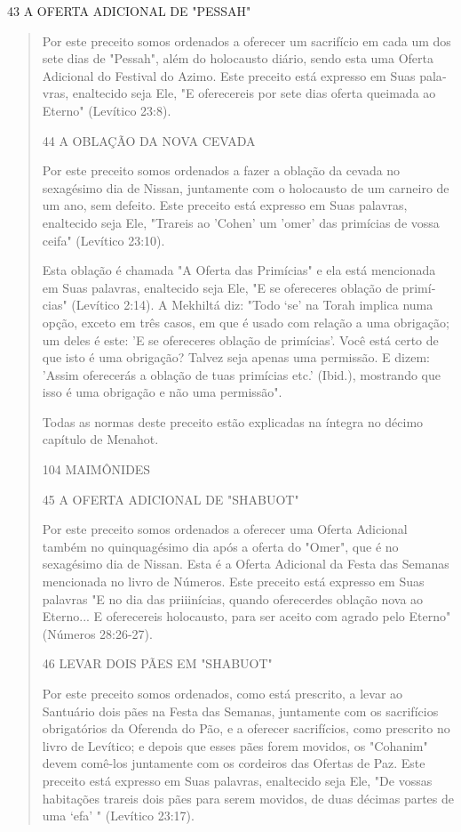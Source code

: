43 A OFERTA ADICIONAL DE "PESSAH"

\begin{quote}
Por este preceito somos ordenados a oferecer um sacrifício em cada um
dos sete dias de "Pessah", além do holocausto diário, sendo esta uma
Ofer­ta Adicional do Festival do Azimo. Este preceito está expresso em
Suas pala­vras, enaltecido seja Ele, "E oferecereis por sete dias oferta
queimada ao Eter­no" (Levítico 23:8).

44 A OBLAÇÃO DA NOVA CEVADA

Por este preceito somos ordenados a fazer a oblação da cevada no
sexagésimo dia de Nissan, juntamente com o holocausto de um carneiro de
um ano, sem defeito. Este preceito está expresso em Suas palavras,
enaltecido seja Ele, "Trareis ao 'Cohen' um 'omer' das primícias de
vossa ceifa" (Levítico 23:10).

Esta oblação é chamada "A Oferta das Primícias" e ela está mencio­nada
em Suas palavras, enaltecido seja Ele, "E se ofereceres oblação de
primí­cias" (Levítico 2:14). A Mekhiltá diz: "Todo `se' na Torah implica
numa opção, exceto em três casos, em que é usado com relação a uma
obrigação; um deles é este: 'E se ofereceres oblação de primícias'. Você
está certo de que isto é uma obrigação? Talvez seja apenas uma
permissão. E dizem: 'Assim oferecerás a obla­ção de tuas primícias etc.'
(Ibid.), mostrando que isso é uma obrigação e não uma permissão".

Todas as normas deste preceito estão explicadas na íntegra no déci­mo
capítulo de Menahot.

104 MAIMÔNIDES

45 A OFERTA ADICIONAL DE "SHABUOT"

Por este preceito somos ordenados a oferecer uma Oferta Adicional também
no quinquagésimo dia após a oferta do "Omer", que é no sexagésimo dia de
Nissan. Esta é a Oferta Adicional da Festa das Semanas mencionada no
livro de Números. Este preceito está expresso em Suas palavras "E no dia
das priiinícias, quando oferecerdes oblação nova ao Eterno... E
oferecereis holocaus­to, para ser aceito com agrado pelo Eterno"
(Números 28:26-27).

46 LEVAR DOIS PÃES EM "SHABUOT"

Por este preceito somos ordenados, como está prescrito, a levar ao
Santuário dois pães na Festa das Semanas, juntamente com os sacrifícios
obri­gatórios da Oferenda do Pão, e a oferecer sacrifícios, como
prescrito no livro de Levítico; e depois que esses pães forem movidos,
os "Cohanim" devem comê-los juntamente com os cordeiros das Ofertas de
Paz. Este preceito está expres­so em Suas palavras, enaltecido seja Ele,
"De vossas habitações trareis dois pães para serem movidos, de duas
décimas partes de uma `efa' " (Levítico 23:17).


\end{quote}
